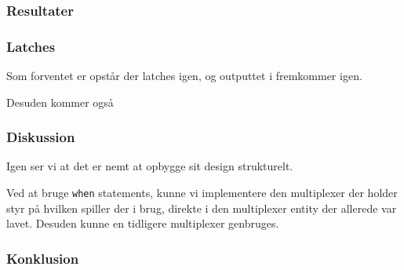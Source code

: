 {%
\subsubsection{Resultater}

\subsubsection*{Latches}

Som forventet er opstår der latches igen, og outputtet i  fremkommer igen. 

Desuden kommer også 


\subsubsection{Diskussion}
Igen ser vi at det er nemt at opbygge sit design strukturelt.

Ved at bruge \texttt{when} statements, kunne vi implementere den multiplexer der holder styr på hvilken spiller der i brug, direkte i den multiplexer entity der allerede var lavet. Desuden kunne en tidligere multiplexer genbruges.
\subsubsection{Konklusion}}
